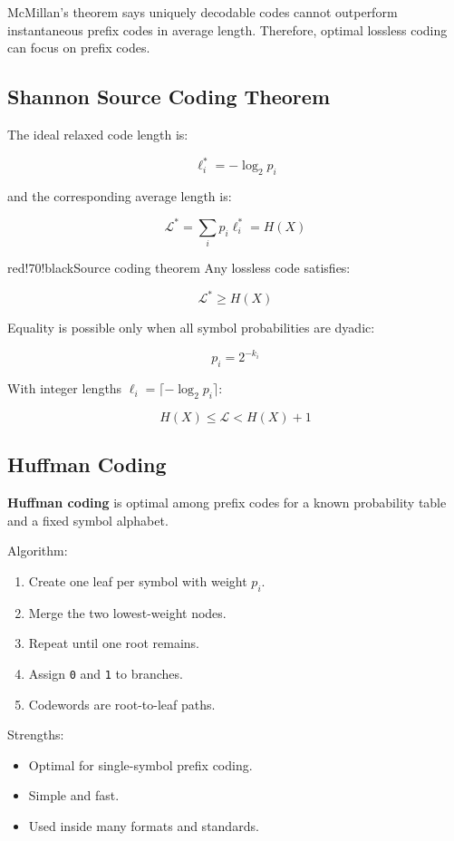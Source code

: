 McMillan's theorem says uniquely decodable codes cannot outperform instantaneous prefix codes in average length. Therefore, optimal lossless coding can focus on prefix codes.

\subsection{Shannon Source Coding Theorem}

The ideal relaxed code length is:

\[
\ell_i^*=-\log_2p_i
\]

and the corresponding average length is:

\[
\mathcal{L}^*=\sum_ip_i\ell_i^*=H(X)
\]

\begin{calloutbox}{red!70!black}{Source coding theorem}
Any lossless code satisfies:

\[
\mathcal{L}^*\geq H(X)
\]

Equality is possible only when all symbol probabilities are dyadic:

\[
p_i=2^{-k_i}
\]

With integer lengths $\ell_i=\lceil-\log_2p_i\rceil$:

\[
H(X)\leq\mathcal{L}<H(X)+1
\]
\end{calloutbox}

\subsection{Huffman Coding}

\textbf{Huffman coding} is optimal among prefix codes for a known probability table and a fixed symbol alphabet.

Algorithm:

\begin{enumerate}
  \item Create one leaf per symbol with weight $p_i$.
  \item Merge the two lowest-weight nodes.
  \item Repeat until one root remains.
  \item Assign \texttt{0} and \texttt{1} to branches.
  \item Codewords are root-to-leaf paths.
\end{enumerate}

Strengths:

\begin{itemize}
  \item Optimal for single-symbol prefix coding.
  \item Simple and fast.
  \item Used inside many formats and standards.
\end{itemize}

